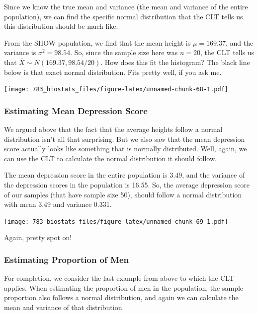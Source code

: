 \documentclass[]{book}
\theoremstyle{definition}
\theoremstyle{definition}
\theoremstyle{definition}
\theoremstyle{remark}
\begin{document}
Since we know the true mean and variance (the mean and variance of the entire population), we can find the specific normal distribution that the CLT tells us this distribution should be much like.

From the SHOW population, we find that the mean height is \(\mu = 169.37\), and the variance is \(\sigma^2 = 98.54\). So, since the sample size here was \(n = 20\), the CLT tells us that \(\bar{X} \sim N(169.37, 98.54/20)\). How does this fit the histogram? The black line below is that exact normal distribution. Fits pretty well, if you ask me.

\texttt{[image: 783\_biostats\_files/figure-latex/unnamed-chunk-68-1.pdf]}

\hypertarget{estimating-mean-depression-score-1}{%
\subsubsection*{Estimating Mean Depression Score}\label{estimating-mean-depression-score-1}}

We argued above that the fact that the average heights follow a normal distribution isn't all that surprising. But we also saw that the mean depression score actually looks like something that is normally distributed. Well, again, we can use the CLT to calculate the normal distribution it should follow.

The mean depression score in the entire population is 3.49, and the variance of the depression scores in the population is 16.55. So, the average depression score of our samples (that have sample size 50), should follow a normal distribution with mean 3.49 and variance 0.331.

\texttt{[image: 783\_biostats\_files/figure-latex/unnamed-chunk-69-1.pdf]}

Again, pretty spot on!

\hypertarget{estimating-proportion-of-men-1}{%
\subsubsection*{Estimating Proportion of Men}\label{estimating-proportion-of-men-1}}

For completion, we consider the last example from above to which the CLT applies. When estimating the proportion of men in the population, the sample proportion also follows a normal distribution, and again we can calculate the mean and variance of that distribution.
\end{document}
